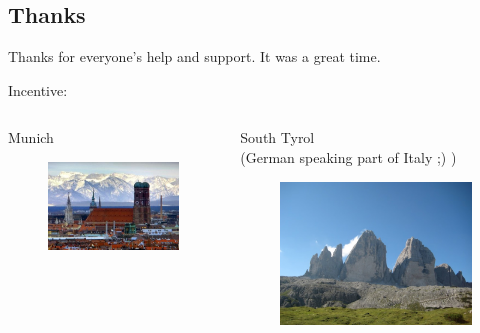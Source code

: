 \documentclass[compress]{beamer}
\begin{document}
\subsection{Thanks}

\begin{frame}
\begin{center}
\huge
Thanks for everyone's help and support. It was a great time.
\end{center}
\end{frame}

\begin{frame}{Incentive:}
\begin{columns}
\begin{column}{.5\textwidth}
Munich
\begin{figure}[t]
    \centering
    \includegraphics[width=.9\textwidth]{images/munich.jpg}
\end{figure}
\end{column}
\begin{column}{.5\textwidth}
South Tyrol\\
\tiny{(German speaking part of Italy ;) )}
\begin{figure}[t]
    \centering
    \includegraphics[width=.9\textwidth]{images/drei_zinnen.jpg}
\end{figure}
\end{column}
\end{columns}
\end{frame}
\end{document}
